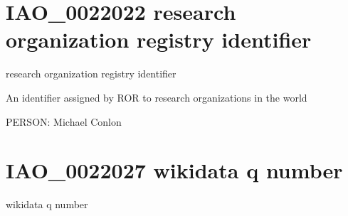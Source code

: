 \documentclass[letterpaper,10pt,english]{sphinxmanual}
\begin{document}
\section{IAO\_0022022 \sphinxhyphen{} research organization registry identifier}
\label{\detokenize{doc-IAO_0022022:iao-0022022-research-organization-registry-identifier}}\label{\detokenize{doc-IAO_0022022:index-0}}\label{\detokenize{doc-IAO_0022022::doc}}
\begin{sphinxShadowBox}

\sphinxAtStartPar
research organization registry identifier
\end{sphinxShadowBox}

\begin{sphinxShadowBox}

\sphinxAtStartPar
An identifier assigned by ROR to research organizations in the world
\end{sphinxShadowBox}

\begin{sphinxShadowBox}

\sphinxAtStartPar
{}
\end{sphinxShadowBox}

\begin{sphinxShadowBox}

\sphinxAtStartPar
{}
\end{sphinxShadowBox}

\begin{sphinxShadowBox}

\sphinxAtStartPar
PERSON: Michael Conlon
\end{sphinxShadowBox}
\begin{quote}
\label{\detokenize{doc-IAO_0022027:iao-0022027}}\label{\detokenize{doc-IAO_0022027:wikidata-q-number}}\label{\detokenize{doc-IAO_0022027:iao-0022027}}
\ignorespaces \end{quote}


\section{IAO\_0022027 \sphinxhyphen{} wikidata q number}
\label{\detokenize{doc-IAO_0022027:iao-0022027-wikidata-q-number}}\label{\detokenize{doc-IAO_0022027:index-0}}\label{\detokenize{doc-IAO_0022027::doc}}
\begin{sphinxShadowBox}

\sphinxAtStartPar
wikidata q number
\end{sphinxShadowBox}
\end{document}
